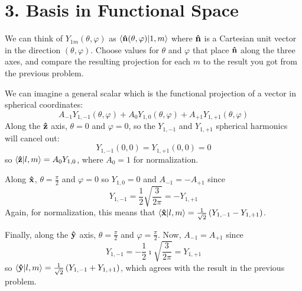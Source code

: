 \documentclass[a4paper,twoside]{article}
\begin{document}
\section*{3. Basis in Functional Space}
We can think of $ Y_{1m}(\theta, \varphi) $ as $\bra{\vu{n}(\theta, \varphi)}\ket{1,m} $ where $ \vu{n} $ is a Cartesian unit vector in the direction $ (\theta, \varphi) $. Choose values for $ \theta $ and $ \varphi $ that place $ \vu{n} $ along the three axes, and compare the resulting projection for each $ m $ to the result you got from the previous problem.
\begin{problem} 
    We can imagine a general scalar which is the functional projection of a vector in spherical coordinates:
    \begin{equation}
        A_{-1} Y_{1,-1}(\theta, \varphi) + A_{0} Y_{1,0}(\theta, \varphi) + A_{+1} Y_{1,+1}(\theta, \varphi)
    \end{equation}
    Along the $ \vu{z} $ axis, $\theta = 0$ and $ \varphi = 0 $, so the $ Y_{1,-1} $ and $ Y_{1,+1} $ spherical harmonics will cancel out:
    \begin{equation}
        Y_{1,-1}(0, 0) = Y_{1,+1}(0, 0) = 0
    \end{equation}
    so $ \bra{\vu{z}}\ket{l,m}  = A_0 Y_{1,0} $, where $ A_0 = 1 $ for normalization.

    Along $ \vu{x} $, $ \theta = \frac{\pi}{2} $ and $ \varphi = 0 $ so $ Y_{1,0} = 0 $ and $ A_{-1} = - A_{+1} $ since
    \begin{equation}
        Y_{1,-1} = \frac{1}{2} \sqrt{\frac{3}{2 \pi}} = - Y_{1,+1}
    \end{equation}
    Again, for normalization, this means that $ \bra{\vu{x}}\ket{l,m} = \frac{1}{\sqrt{2}} \left( Y_{1,-1} - Y_{1,+1} \right)$.

    Finally, along the $ \vu{y} $ axis, $ \theta = \frac{\pi}{2} $ and $ \varphi = \frac{\pi}{2} $. Now, $ A_{-1} = A_{+1} $ since
    \begin{equation}
        Y_{1,-1} = - \frac{1}{2} \imath \sqrt{\frac{3}{2 \pi}} = Y_{1, +1}
    \end{equation}
    so $ \bra{\vu{y}}\ket{l,m} = \frac{1}{\sqrt{2}} \left( Y_{1,-1} + Y_{1,+1} \right) $, which agrees with the result in the previous problem.
\end{problem}
\end{document}
